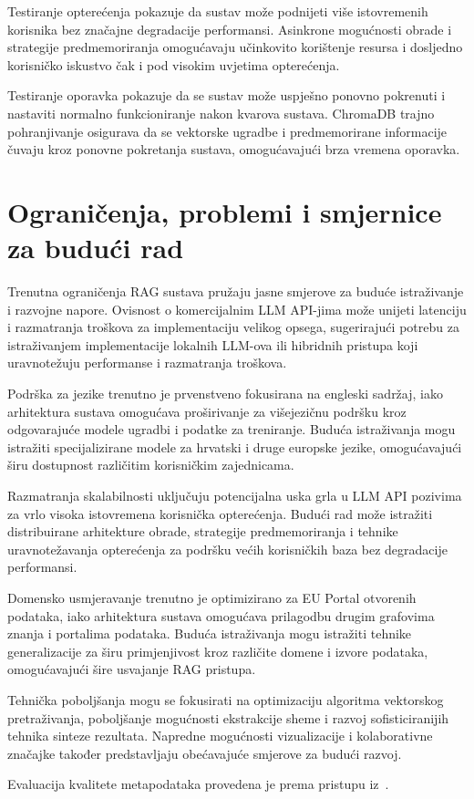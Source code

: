 Testiranje opterećenja pokazuje da sustav može podnijeti više istovremenih korisnika bez značajne degradacije performansi. Asinkrone mogućnosti obrade i strategije predmemoriranja omogućavaju učinkovito korištenje resursa i dosljedno korisničko iskustvo čak i pod visokim uvjetima opterećenja.

Testiranje oporavka pokazuje da se sustav može uspješno ponovno pokrenuti i nastaviti normalno funkcioniranje nakon kvarova sustava. ChromaDB trajno pohranjivanje osigurava da se vektorske ugradbe i predmemorirane informacije čuvaju kroz ponovne pokretanja sustava, omogućavajući brza vremena oporavka.

\section{Ograničenja, problemi i smjernice za budući rad}

Trenutna ograničenja RAG sustava pružaju jasne smjerove za buduće istraživanje i razvojne napore. Ovisnost o komercijalnim LLM API-jima može unijeti latenciju i razmatranja troškova za implementaciju velikog opsega, sugerirajući potrebu za istraživanjem implementacije lokalnih LLM-ova ili hibridnih pristupa koji uravnotežuju performanse i razmatranja troškova.

Podrška za jezike trenutno je prvenstveno fokusirana na engleski sadržaj, iako arhitektura sustava omogućava proširivanje za višejezičnu podršku kroz odgovarajuće modele ugradbi i podatke za treniranje. Buduća istraživanja mogu istražiti specijalizirane modele za hrvatski i druge europske jezike, omogućavajući širu dostupnost različitim korisničkim zajednicama.

Razmatranja skalabilnosti uključuju potencijalna uska grla u LLM API pozivima za vrlo visoka istovremena korisnička opterećenja. Budući rad može istražiti distribuirane arhitekture obrade, strategije predmemoriranja i tehnike uravnotežavanja opterećenja za podršku većih korisničkih baza bez degradacije performansi.

Domensko usmjeravanje trenutno je optimizirano za EU Portal otvorenih podataka, iako arhitektura sustava omogućava prilagodbu drugim grafovima znanja i portalima podataka. Buduća istraživanja mogu istražiti tehnike generalizacije za širu primjenjivost kroz različite domene i izvore podataka, omogućavajući šire usvajanje RAG pristupa.

Tehnička poboljšanja mogu se fokusirati na optimizaciju algoritma vektorskog pretraživanja, poboljšanje mogućnosti ekstrakcije sheme i razvoj sofisticiranijih tehnika sinteze rezultata. Napredne mogućnosti vizualizacije i kolaborativne značajke također predstavljaju obećavajuće smjerove za budući razvoj.

Evaluacija kvalitete metapodataka provedena je prema pristupu iz~\cite{neumaier2016automated}. 